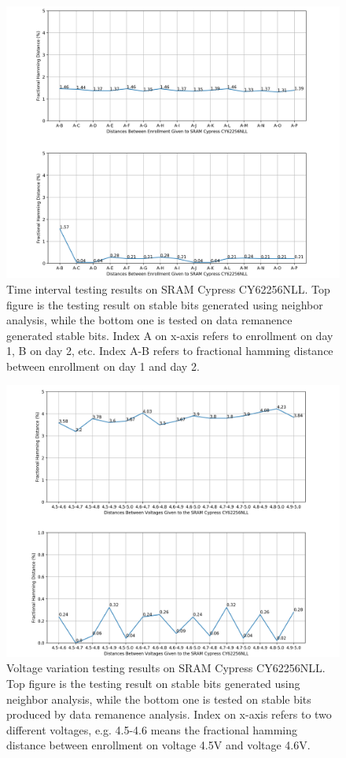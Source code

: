 \begin{figure}[tph!]
    \centerline{\includegraphics[width={1.1\textwidth}]{images/cy62256nll_hd_intra_time_stable}}
    \caption{Time interval testing results on SRAM Cypress CY62256NLL. Top figure is the testing result on stable bits generated using neighbor analysis, while the bottom one is tested on data remanence generated stable bits. Index A on x-axis refers to enrollment on day 1, B on day 2, etc. Index A-B refers to fractional hamming distance between enrollment on day 1 and day 2.}
    \label{fig:test_stable_cy62256nll}
\end{figure}

\begin{figure}[tph!]
    \centerline{\includegraphics[width={1.1\textwidth}]{images/cy62256nll_hd_intra_voltage_stable}}
    \caption{Voltage variation testing results on SRAM Cypress CY62256NLL. Top figure is the testing result on stable bits generated using neighbor analysis, while the bottom one is tested on stable bits produced by data remanence analysis. Index on x-axis refers to two different voltages, e.g. 4.5-4.6 means the fractional hamming distance between enrollment on voltage 4.5V and voltage 4.6V.}
    \label{fig:test_stable_cy62256nll_voltage}
\end{figure}

